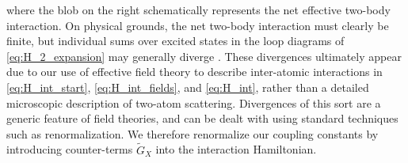 \documentclass[preprint,showkeys,nofootinbib]{revtex4-1}
\newcommand{\1}{\mathds{1}}
\begin{document}
where the blob on the right schematically represents the net effective
two-body interaction.  On physical grounds, the net two-body
interaction must clearly be finite, but individual sums over excited
states in the loop diagrams of \eqref{eq:H_2_expansion} may generally
diverge \cite{johnson2012effective}.  These divergences ultimately
appear due to our use of effective field theory to describe
inter-atomic interactions in \eqref{eq:H_int_start},
\eqref{eq:H_int_fields}, and \eqref{eq:H_int}, rather than a detailed
microscopic description of two-atom scattering.  Divergences of this
sort are a generic feature of field theories, and can be dealt with
using standard techniques such as renormalization.  We therefore
renormalize our coupling constants by introducing counter-terms
$\widetilde G_X$ into the interaction Hamiltonian.
\end{document}
